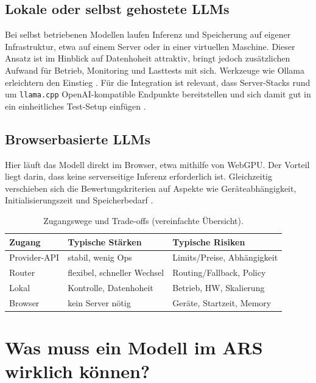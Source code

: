 \subsection{Lokale oder selbst gehostete LLMs}

Bei selbst betriebenen Modellen laufen Inferenz und Speicherung auf eigener Infrastruktur, etwa auf einem Server oder in einer virtuellen Maschine. Dieser Ansatz ist im Hinblick auf Datenhoheit attraktiv, bringt jedoch zusätzlichen Aufwand für Betrieb, Monitoring und Lasttests mit sich. Werkzeuge wie Ollama erleichtern den Einstieg \parencite{ollama}. Für die Integration ist relevant, dass Server-Stacks rund um \texttt{llama.cpp} OpenAI-kompatible Endpunkte bereitstellen und sich damit gut in ein einheitliches Test-Setup einfügen \parencite{llamacpp-server-readme}.

\subsection{Browserbasierte LLMs}

Hier läuft das Modell direkt im Browser, etwa mithilfe von WebGPU. Der Vorteil liegt darin, dass keine serverseitige Inferenz erforderlich ist. Gleichzeitig verschieben sich die Bewertungskriterien auf Aspekte wie Geräteabhängigkeit, Initialisierungszeit und Speicherbedarf \parencite{webllm-github}.

\begin{table}[ht]
  \centering
  \footnotesize
  \setlength{\tabcolsep}{4pt}
  \begin{tabular}{@{}l p{2.2cm} p{2.3cm}@{}}
  \toprule
  \textbf{Zugang} & \textbf{Typische Stärken} & \textbf{Typische Risiken} \\
  \midrule
  Provider-API & stabil, wenig Ops & Limits/Preise, Abhängigkeit \\
  Router & flexibel, schneller Wechsel & Routing/Fallback, Policy \\
  Lokal & Kontrolle, Datenhoheit & Betrieb, HW, Skalierung \\
  Browser & kein Server nötig & Geräte, Startzeit, Memory \\
  \bottomrule
  \end{tabular}
  \caption{Zugangswege und Trade-offs (vereinfachte Übersicht).}
  \label{tab:zugang}
\end{table}

\section{Was muss ein Modell im ARS wirklich können?}

